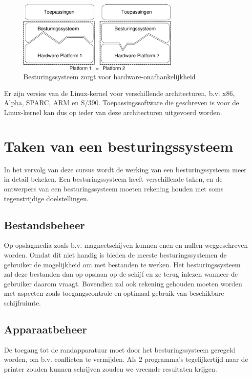 \begin{figure}
\begin{center}
\includegraphics[width=80mm]{images/fig0102.png}
\end{center}
\caption{Besturingssysteem zorgt voor hardware-onafhankelijkheid}
\label{platform}
\end{figure}

Er zijn versies van de Linux-kernel voor verschillende
architecturen, b.v. x86, Alpha, SPARC, ARM en S/390. Toepassingssoftware
die geschreven is voor de Linux-kernel kan dus op ieder van deze
architecturen uitgevoerd worden.

\section{Taken van een besturingssysteem}

In het vervolg van deze cursus wordt de werking van een besturingssysteem
meer in detail bekeken. Een besturingssysteem heeft verschillende taken, en
de ontwerpers van een besturingssysteem moeten rekening houden met soms
tegenstrijdige doelstellingen.

\subsection{Bestandsbeheer}

Op opslagmedia zoals b.v. magneetschijven kunnen enen en nullen
weggeschreven worden. Omdat dit niet handig is bieden de meeste
besturingssystemen de gebruiker de mogelijkheid om met bestanden te
werken. Het besturingssysteem zal deze bestanden dan op opslaan op de
schijf en ze terug inlezen wanneer de gebruiker daarom vraagt.
Bovendien zal ook rekening gehouden moeten worden met aspecten zoals
toegangscontrole en optimaal gebruik van beschikbare
schijfruimte.

\subsection{Apparaatbeheer}

De toegang tot de randapparatuur moet door het besturingssysteem
geregeld worden, om b.v. conflicten te vermijden. Als 2 programma's
tegelijkertijd naar de printer zouden kunnen schrijven zouden we
vreemde resultaten krijgen.

